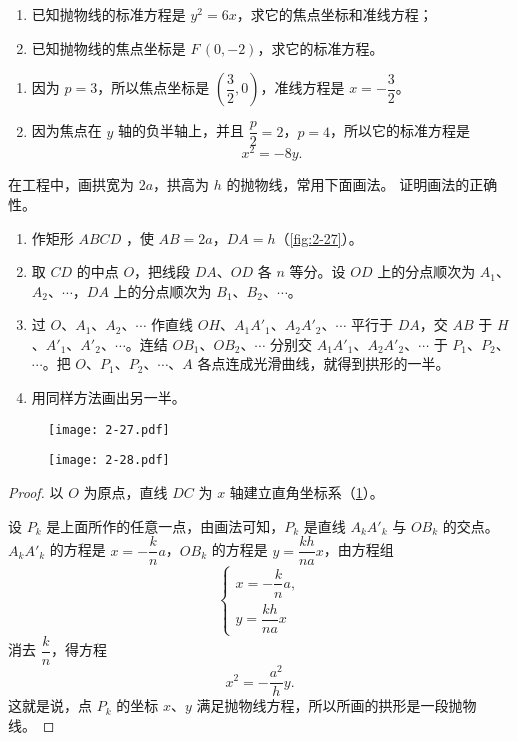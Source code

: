 \begin{example}\mbox{}\par
  \begin{enumerate}
    \item 已知抛物线的标准方程是 $y^2=6x$，求它的焦点坐标和准线方程；
    \item 已知抛物线的焦点坐标是 $F\,(0,-2)$，求它的标准方程。
  \end{enumerate}
\end{example}
\begin{solution}
  \begin{enumerate}
    \item 因为 $p=3$，所以焦点坐标是 $\left(\dfrac{3}{2},0\right)$，准线方程是 $x=-\dfrac{3}{2}$。
    \item 因为焦点在 $y$ 轴的负半轴上，并且 $\dfrac{p}{2}=2$，$p=4$，所以它的标准方程是
    \[ x^2=-8y.\]
  \end{enumerate}
\end{solution}

\begin{example}
  在工程中，画拱宽为 $2a$，拱高为 $h$ 的抛物线，常用下面画法。
  证明画法的正确性。
  \begin{enumerate}
    \item 作矩形 $ABCD$ ，使 $AB=2a$，$DA=h$（\cref{fig:2-27}）。
    \item 取 $CD$ 的中点 $O$，把线段 $DA$、$OD$ 各 $n$ 等分。设 $OD$ 上的分点顺次为 $A_1$、$A_2$、$\cdots$，$DA$ 上的分点顺次为 $B_1$、$B_2$、$\cdots$。
    \item 过 $O$、$A_1$、$A_2$、$\cdots$ 作直线 $OH$、$A_1A'_1$、$A_2A'_2$、$\cdots$ 平行于 $DA$，交 $AB$ 于 $H$、$A'_1$、$A'_2$、$\cdots$。连结 $OB_1$、$OB_2$、$\cdots$ 分别交 $A_1A'_1$、$A_2A'_2$、$\cdots$ 于 $P_1$、$P_2$、$\cdots$。把 $O$、$P_1$、$P_2$、$\cdots$、$A$ 各点连成光滑曲线，就得到拱形的一半。
    \item 用同样方法画出另一半。
  \end{enumerate}
\end{example}
\begin{figure}
  \begin{minipage}[b]{0.43\linewidth}\centering
    \texttt{[image: 2-27.pdf]}
    \caption{}\label{fig:2-27}
  \end{minipage}
  \begin{minipage}[b]{0.52\linewidth}\centering
    \texttt{[image: 2-28.pdf]}
    \caption{}\label{fig:2-28}
  \end{minipage}
\end{figure}
\begin{proof}
  以 $O$ 为原点，直线 $DC$ 为 $x$ 轴建立直角坐标系（\cref{fig:2-28}）。

  设 $P_k$ 是上面所作的任意一点，由画法可知，$P_k$ 是直线 $A_kA'_k$ 与 $OB_k$ 的交点。$A_kA'_k$ 的方程是 $x=-\dfrac{k}{n}a$，$OB_k$ 的方程是 $y=\dfrac{kh}{na}x$，由方程组
  \[ \begin{cases} x=-\dfrac{k}{n}a, \\[10pt] y=\dfrac{kh}{na}x\end{cases}\]
  消去 $\dfrac{k}{n}$，得方程
  \[ x^2=-\frac{a^2}{h}y.\]
  这就是说，点 $P_k$ 的坐标 $x$、$y$ 满足抛物线方程，所以所画的拱形是一段抛物线。
\end{proof}

